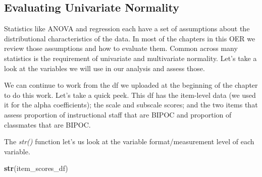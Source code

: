 \documentclass[
  11pt,
]{book}
\newenvironment{Shaded}{\begin{snugshade}}{\end{snugshade}}
\newcommand{\FunctionTok}[1]{\textcolor[rgb]{0.27,0.27,0.27}{\textbf{#1}}}
\newcommand{\NormalTok}[1]{#1}
\begin{document}
\hypertarget{evaluating-univariate-normality}{%
\subsection{Evaluating Univariate Normality}\label{evaluating-univariate-normality}}

Statistics like ANOVA and regression each have a set of assumptions about the distributional characteristics of the data. In most of the chapters in this OER we review those assumptions and how to evaluate them. Common across many statistics is the requirement of univariate and multivariate normality. Let's take a look at the variables we will use in our analysis and assess those.

We can continue to work from the df we uploaded at the beginning of the chapter to do this work. Let's take a quick peek. This df has the item-level data (we used it for the alpha coefficients); the scale and subscale scores; and the two items that assess proportion of instructional staff that are BIPOC and proportion of classmates that are BIPOC.

The \emph{str()} function let's us look at the variable format/measurement level of each variable.

\begin{Shaded}
\begin{Highlighting}[]
\FunctionTok{str}\NormalTok{(item\_scores\_df)}
\end{Highlighting}
\end{Shaded}
\end{document}
